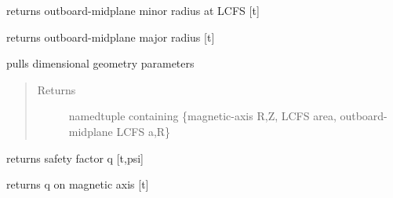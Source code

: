\documentclass[letterpaper,10pt,english]{sphinxmanual}
\begin{document}
\begin{fulllineitems}
\begin{fulllineitems}
\end{fulllineitems}


\begin{fulllineitems}
\label{eqtools:eqtools.EFIT.EFITTree.getAOut}
returns outboard-midplane minor radius at LCFS {[}t{]}

\end{fulllineitems}


\begin{fulllineitems}
\label{eqtools:eqtools.EFIT.EFITTree.getRmidOut}
returns outboard-midplane major radius {[}t{]}

\end{fulllineitems}


\begin{fulllineitems}
\label{eqtools:eqtools.EFIT.EFITTree.getGeometry}
pulls dimensional geometry parameters
\begin{quote}\begin{description}
\item[{Returns}] \leavevmode
namedtuple containing \{magnetic-axis R,Z, LCFS area, outboard-midplane LCFS a,R\}

\end{description}\end{quote}

\end{fulllineitems}


\begin{fulllineitems}
\label{eqtools:eqtools.EFIT.EFITTree.getQProfile}
returns safety factor q {[}t,psi{]}

\end{fulllineitems}


\begin{fulllineitems}
\label{eqtools:eqtools.EFIT.EFITTree.getQ0}
returns q on magnetic axis {[}t{]}


\end{fulllineitems}
\end{fulllineitems}
\end{document}
